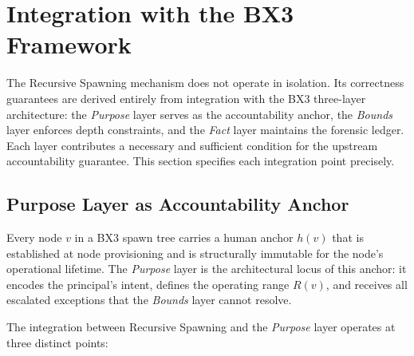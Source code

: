 \section{Integration with the BX3 Framework}
\label{sec:integration}

The Recursive Spawning mechanism does not operate in isolation. Its correctness
guarantees are derived entirely from integration with the BX3 three-layer
architecture: the \textit{Purpose} layer serves as the accountability anchor,
the \textit{Bounds} layer enforces depth constraints, and the \textit{Fact} layer
maintains the forensic ledger. Each layer contributes a necessary and
sufficient condition for the upstream accountability guarantee. This section
specifies each integration point precisely.

\subsection{Purpose Layer as Accountability Anchor}
\label{sec:purpose-anchor}

Every node $v$ in a BX3 spawn tree carries a human anchor $h(v)$ that is
established at node provisioning and is structurally immutable for the node's
operational lifetime. The \textit{Purpose} layer is the architectural locus of
this anchor: it encodes the principal's intent, defines the operating range
$R(v)$, and receives all escalated exceptions that the \textit{Bounds} layer
cannot resolve.

The integration between Recursive Spawning and the \textit{Purpose} layer
operates at three distinct points:

